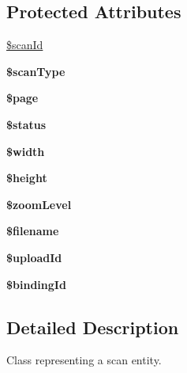 \subsection*{Protected Attributes}
\begin{DoxyCompactItemize}
\item 
\hyperlink{classScan_a4a0ff118e90fc192615f59bbb32e5a7e}{\$scanId}
\item 
\hypertarget{classScan_a16f9fddedd31312186eacf832862a140}{
{\bfseries \$scanType}}
\label{classScan_a16f9fddedd31312186eacf832862a140}

\item 
\hypertarget{classScan_a5c7dcddddb9fbb8d6f97a1f0772753c7}{
{\bfseries \$page}}
\label{classScan_a5c7dcddddb9fbb8d6f97a1f0772753c7}

\item 
\hypertarget{classScan_a792a6afa609cf3facf8162de86cb2299}{
{\bfseries \$status}}
\label{classScan_a792a6afa609cf3facf8162de86cb2299}

\item 
\hypertarget{classScan_a9d74b1c9b56be79120ff60afea7260c6}{
{\bfseries \$width}}
\label{classScan_a9d74b1c9b56be79120ff60afea7260c6}

\item 
\hypertarget{classScan_a4504208647e43fc37d30da80988c7ebb}{
{\bfseries \$height}}
\label{classScan_a4504208647e43fc37d30da80988c7ebb}

\item 
\hypertarget{classScan_ade9d70de4af2677cd62ce8b9604cb3f2}{
{\bfseries \$zoomLevel}}
\label{classScan_ade9d70de4af2677cd62ce8b9604cb3f2}

\item 
\hypertarget{classScan_af02b3ddcf57bc8ff2805c591b81ddb31}{
{\bfseries \$filename}}
\label{classScan_af02b3ddcf57bc8ff2805c591b81ddb31}

\item 
\hypertarget{classScan_a018817763039daa0dcbc13b97badfa4a}{
{\bfseries \$uploadId}}
\label{classScan_a018817763039daa0dcbc13b97badfa4a}

\item 
\hypertarget{classScan_a966a05e2f36cbb45f71123414db8aafa}{
{\bfseries \$bindingId}}
\label{classScan_a966a05e2f36cbb45f71123414db8aafa}

\end{DoxyCompactItemize}


\subsection{Detailed Description}
Class representing a scan entity. 

